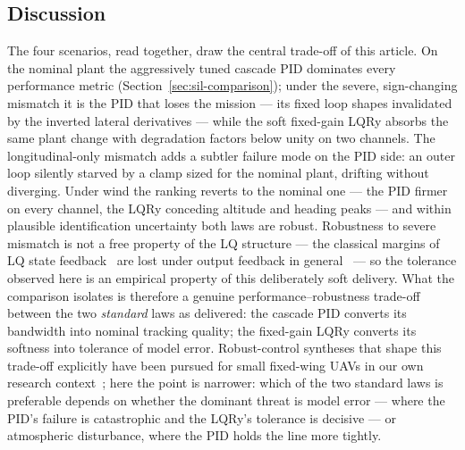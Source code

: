\subsection{Discussion}
\label{sec:rob-discussion}
The four scenarios, read together, draw the central trade-off of this
article. On the nominal plant the aggressively tuned cascade PID
dominates every performance metric (Section~\ref{sec:sil-comparison});
under the severe, sign-changing mismatch it is the PID that loses the
mission --- its fixed loop shapes invalidated by the inverted lateral
derivatives --- while the soft fixed-gain LQRy absorbs the same plant
change with degradation factors below unity on two channels. The
longitudinal-only mismatch adds a subtler failure mode on the PID
side: an outer loop silently starved by a clamp sized for the nominal
plant, drifting without diverging. Under wind the ranking reverts to
the nominal one --- the PID firmer on every channel, the LQRy
conceding altitude and heading peaks --- and within plausible
identification uncertainty both laws are robust. Robustness to severe
mismatch is not a free property of the LQ structure --- the classical
margins of LQ state feedback~\cite{safonov1977gain} are lost under
output feedback in general~\cite{doyle1978guaranteed} --- so the
tolerance observed here is an empirical property of this deliberately
soft delivery.
What the comparison isolates is therefore a genuine
performance--robustness trade-off between the two \emph{standard}
laws as delivered: the cascade PID converts its bandwidth into
nominal tracking quality; the fixed-gain LQRy converts its softness
into tolerance of model error. Robust-control syntheses that shape
this trade-off explicitly have been pursued for small fixed-wing UAVs
in our own research context~\cite{abdulhamid2016robusto}; here the
point is narrower: which of the two standard laws is preferable
depends on whether the dominant threat is model error --- where the
PID's failure is catastrophic and the LQRy's tolerance is decisive
--- or atmospheric disturbance, where the PID holds the line more
tightly.
